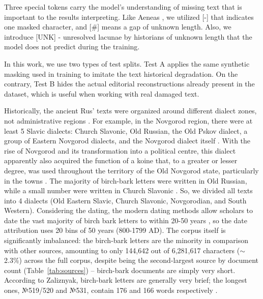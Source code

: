 \documentclass{article}
\begin{document}
Three special tokens carry the model's understanding of missing text that is important to the results interpreting. Like Aeneas \cite{assael2025}, we utilized [-] that indicates one masked character, and [\#] means a gap of unknown length. Also, we introduce [UNK] - unresolved lacunae by historians of unknown length that the model does not predict during the training.

In this work, we use two types of test splits. Test A applies the same synthetic masking used in training to imitate the text historical degradation. On the contrary, Test B hides the actual editorial reconstructions already present in the dataset, which is useful when working with real damaged text.

Historically, the ancient Rus' texts were organized around different dialect zones, not administrative regions \cite{zaliznyak2004}. For example, in the Novgorod region, there were at least 5 Slavic dialects: Church Slavonic, Old Russian, the Old Pskov dialect, a group of Eastern Novgorod dialects, and the Novgorod dialect itself \cite{zaliznyak2004}. With the rise of Novgorod and its transformation into a political centre, this dialect apparently also acquired the function of a koine that, to a greater or lesser degree, was used throughout the territory of the Old Novgorod state, particularly in the towns \cite{zaliznyak2004}. The majority of birch-bark letters were written in Old Russian, while a small number were written in Church Slavonic \cite{zaliznyak2004}. So, we divided all texts into 4 dialects (Old Eastern Slavic, Church Slavonic, Novgorodian, and South Western). Considering the dating, the modern dating methods allow scholars to date the vast majority of birch bark letters to within 20-50 years \cite{zaliznyak2004,yanin2000}, so the date attribution uses 20 bins of 50 years (800-1799 AD).
The corpus itself is significantly imbalanced: the birch-bark letters are the minority in comparison with other sources, amounting to only 144{,}642 out of 6{,}281{,}617 characters ($\sim$2.3\%) across the full corpus, despite being the second-largest source by document count (Table~\ref{tab:sources}) -- birch-bark documents are simply very short. According to Zaliznyak, birch-bark letters are generally very brief; the longest ones, №519/520 and №531, contain 176 and 166 words respectively \cite{zaliznyak2004}.
\end{document}
